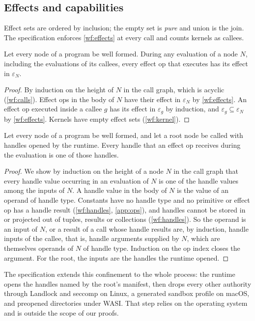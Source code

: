 \subsection{Effects and capabilities}

Effect sets are ordered by inclusion; the empty set is \emph{pure} and union is the join. The
specification enforces \ref{wf:effects} at every call and counts kernels as callees.

\begin{proposition}\label{prop:effects}
Let every node of a program be well formed. During any evaluation of a node $N$, including the
evaluations of its callees, every effect op that executes has its effect in $\varepsilon_N$.
\end{proposition}
\begin{proof}
By induction on the height of $N$ in the call graph, which is acyclic (\ref{wf:calls}). Effect
ops in the body of $N$ have their effect in $\varepsilon_N$ by \ref{wf:effects}. An effect op
executed inside a callee $g$ has its effect in $\varepsilon_g$ by induction, and
$\varepsilon_g\subseteq\varepsilon_N$ by \ref{wf:effects}. Kernels have empty effect sets
(\ref{wf:kernel}).
\end{proof}

\begin{proposition}\label{prop:caps}
Let every node of a program be well formed, and let a root node be called with handles opened
by the runtime. Every handle that an effect op receives during the evaluation is one of those
handles.
\end{proposition}
\begin{proof}
We show by induction on the height of a node $N$ in the call graph that every handle value
occurring in an evaluation of $N$ is one of the handle values among the inputs of $N$. A handle
value in the body of $N$ is the value of an operand of handle type. Constants have no handle
type and no primitive or effect op has a handle result (\ref{wf:handles},
\cref{app:ops}), and handles cannot be stored in or projected out of tuples, results or
collections (\ref{wf:handles}). So the operand is an input of $N$, or a result of a call whose
handle results are, by induction, handle inputs of the callee, that is, handle arguments
supplied by $N$, which are themselves operands of $N$ of handle type. Induction on the op
index closes the argument. For the root, the inputs are the handles the runtime opened.
\end{proof}

The specification extends this confinement to the whole process: the runtime opens the
handles named by the root's manifest, then drops every other authority through Landlock and
seccomp on Linux, a generated sandbox profile on macOS, and preopened directories under WASI.
That step relies on the operating system and is outside the scope of our proofs.
